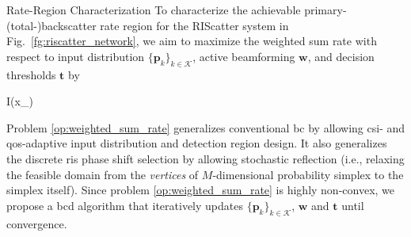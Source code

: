 \documentclass[journal,12pt,onecolumn,draftclsnofoot]{IEEEtran}
\theoremstyle{remark}
\begin{document}
\begin{section}{Rate-Region Characterization}
	To characterize the achievable primary-(total-)backscatter rate region for the RIScatter system in Fig.~\ref{fg:riscatter_network}, we aim to maximize the weighted sum rate with respect to input distribution $\{\boldsymbol{p}_k\}_{k \in \mathcal{K}}$, active beamforming $\boldsymbol{w}$, and decision thresholds $\boldsymbol{t}$ by
	\begin{maxi!}
		{}{I(x_{})}{\label{op:weighted_sum_rate}}{\label{ob:weighted_sum_rate}}
	\end{maxi!}

	Problem \eqref{op:weighted_sum_rate} generalizes conventional \gls{bc} by allowing \gls{csi}- and \gls{qos}-adaptive input distribution and detection region design.
	It also generalizes the discrete \gls{ris} phase shift selection by allowing stochastic reflection (i.e., relaxing the feasible domain from the \emph{vertices} of $M$-dimensional probability simplex to the simplex itself).
	Since problem \eqref{op:weighted_sum_rate} is highly non-convex, we propose a \gls{bcd} algorithm that iteratively updates $\{\boldsymbol{p}_k\}_{k \in \mathcal{K}}$, $\boldsymbol{w}$ and $\boldsymbol{t}$ until convergence.


\end{section}
\end{document}
